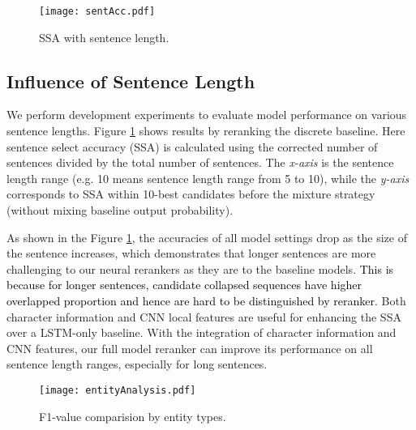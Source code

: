 \documentclass[11pt,a4paper]{article}
\begin{document}
\begin{figure}[t] 
  \centering 
  \texttt{[image: sentAcc.pdf]}
  \caption{SSA with sentence length.}
  \label{fig:sentAcc}
\end{figure}

\subsection{Influence of Sentence Length}
We perform development experiments to evaluate model performance on various sentence lengths. Figure \ref{fig:sentAcc} shows results by reranking the discrete baseline. Here sentence select accuracy (SSA) is calculated using the corrected number of sentences divided by the total number of sentences.
The \textit{x-axis} is the sentence length range (e.g. 10 means sentence length range from 5 to 10), while the \textit{y-axis} corresponds to SSA within 10-best candidates before the mixture strategy (without mixing baseline output probability). 

As shown in the Figure \ref{fig:sentAcc}, the accuracies of all model settings drop as the size of the sentence increases, which demonstrates that longer sentences are more challenging to our neural rerankers as they are to the baseline models. \textcolor{black}{This is because for longer sentences, candidate collapsed sequences have higher overlapped proportion and hence are hard to be distinguished by reranker.}  Both character information and CNN local features are useful for enhancing the SSA over a LSTM-only baseline. With the integration of character information and CNN features, our full model reranker can improve its performance on all sentence length ranges, especially for long sentences.

\begin{figure}[t] 
  \centering 
  \texttt{[image: entityAnalysis.pdf]}
  \caption{F1-value comparision by entity types.}
  \label{fig:entityAnalysis}
\end{figure}
\end{document}
